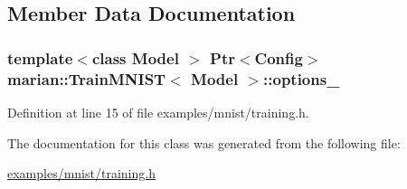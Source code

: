 \subsection{Member Data Documentation}
\subsubsection[{\texorpdfstring{options\+\_\+}{options_}}]{\setlength{\rightskip}{0pt plus 5cm}template$<$class Model $>$ {\bf Ptr}$<${\bf Config}$>$ {\bf marian\+::\+Train\+M\+N\+I\+ST}$<$ Model $>$\+::options\+\_\+\hspace{0.3cm}{\ttfamily [private]}}\hypertarget{classmarian_1_1TrainMNIST_ae36f7408da78a03ee64f6f8eb807e6e8}{}\label{classmarian_1_1TrainMNIST_ae36f7408da78a03ee64f6f8eb807e6e8}


Definition at line 15 of file examples/mnist/training.\+h.



The documentation for this class was generated from the following file\+:\begin{DoxyCompactItemize}
\item 
\hyperlink{examples_2mnist_2training_8h}{examples/mnist/training.\+h}\end{DoxyCompactItemize}
